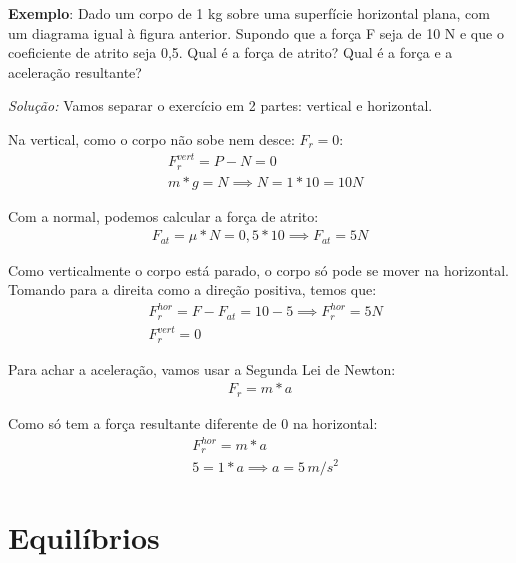 \documentclass[12pt]{extarticle}
\newcommand{\<}{\langle}
\renewcommand{\>}{\rangle}
\theoremstyle{definition}
\begin{document}
\textbf{Exemplo}: Dado um corpo de 1 kg sobre uma superfície horizontal plana, com um diagrama igual à figura anterior. Supondo que a força F seja de 10 N e que o coeficiente de atrito seja 0,5. Qual é a força de atrito? Qual é a força e a aceleração resultante?

\textit{Solução:} Vamos separar o exercício em 2 partes: vertical e horizontal.

Na vertical, como o corpo não sobe nem desce: $F_r = 0$:
\begin{align*}
    &F_r^{vert} = P - N =0 \\
    &m*g = N \implies N = 1*10 = 10 N 
\end{align*}

Com a normal, podemos calcular a força de atrito:
\begin{align*}
    F_{at} = \mu*N = 0,5*10\implies \boxed{F_{at} = 5 N}
\end{align*}

Como verticalmente o corpo está parado, o corpo só pode se mover na horizontal. Tomando para a direita como a direção positiva, temos que:
\begin{align*}
    &F_r^{hor} = F - F_{at} = 10 - 5 \implies \boxed{F_r^{hor} = 5 N }\\
    &\boxed{F_r^{vert} = 0}
\end{align*}

Para achar a aceleração, vamos usar a Segunda Lei de Newton:
\begin{align*}
    F_r = m*a 
\end{align*}

Como só tem a força resultante diferente de 0 na horizontal:
\begin{align*}
    &F_r^{hor} = m*a \\
    &5=1*a \implies \boxed{a = 5\,m/s^2}
\end{align*}

\section{Equilíbrios}
\end{document}
